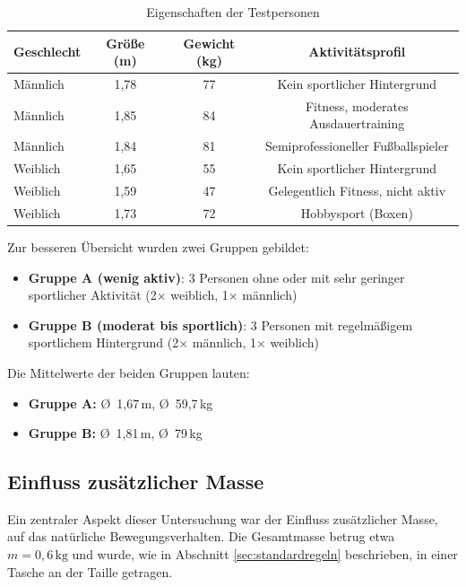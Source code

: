\begin{table}[H]
	\centering
	\begin{tabular}{|l|c|c|c|}
		\hline
		\textbf{Geschlecht} & \textbf{Größe (m)} & \textbf{Gewicht (kg)} & \textbf{Aktivitätsprofil} \\
		\hline
		Männlich & 1{,}78 & 77 & Kein sportlicher Hintergrund \\
		Männlich & 1{,}85 & 84 & Fitness, moderates Ausdauertraining \\
		Männlich & 1{,}84 & 81 & Semiprofessioneller Fußballspieler \\
		Weiblich & 1{,}65 & 55 & Kein sportlicher Hintergrund \\
		Weiblich & 1{,}59 & 47 & Gelegentlich Fitness, nicht aktiv \\
		Weiblich & 1{,}73 & 72 & Hobbysport (Boxen) \\
		\hline
	\end{tabular}
	\caption{Eigenschaften der Testpersonen}
	\label{tab:testpersonen}
\end{table}

 Zur besseren Übersicht wurden zwei Gruppen gebildet:
 \newpage
 
\begin{itemize}
	\item \textbf{Gruppe A (wenig aktiv)}: 3 Personen ohne oder mit sehr geringer sportlicher Aktivität (2× weiblich, 1× männlich)
	\item \textbf{Gruppe B (moderat bis sportlich)}: 3 Personen mit regelmäßigem sportlichem Hintergrund (2× männlich, 1× weiblich)
\end{itemize}

Die Mittelwerte der beiden Gruppen lauten:

\begin{itemize}
	\item \textbf{Gruppe A:} Ø~1{,}67\,m, Ø~59{,}7\,kg
	\item \textbf{Gruppe B:} Ø~1{,}81\,m, Ø~79\,kg
\end{itemize}

\subsection{Einfluss zusätzlicher Masse}
\label{sec:gewichtseinfluss}

Ein zentraler Aspekt dieser Untersuchung war der Einfluss zusätzlicher Masse, auf das natürliche Bewegungsverhalten. Die Gesamtmasse betrug etwa $m = 0{,}6\,\text{kg}$ und wurde, wie in Abschnitt \ref{sec:standardregeln} beschrieben, in einer Tasche an der Taille getragen.

